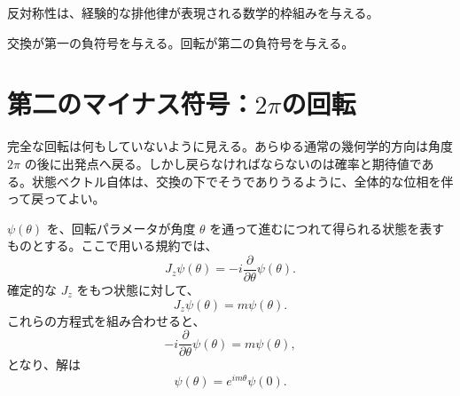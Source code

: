 反対称性は、経験的な排他律が表現される数学的枠組みを与える。

\begin{classroomqa}
\end{classroomqa}

交換が第一の負符号を与える。回転が第二の負符号を与える。

\section{第二のマイナス符号：\texorpdfstring{\(2\pi\)}{2 パイ}の回転}

完全な回転は何もしていないように見える。あらゆる通常の幾何学的方向は角度 \(2\pi\) の後に出発点へ戻る。しかし戻らなければならないのは確率と期待値である。状態ベクトル自体は、交換の下でそうでありうるように、全体的な位相を伴って戻ってよい。

\begin{classroomqa}
\end{classroomqa}


\(\psi(\theta)\) を、回転パラメータが角度 \(\theta\) を通って進むにつれて得られる状態を表すものとする。ここで用いる規約では、
\begin{equation}
J_z\psi(\theta)
=
-i\frac{\partial}{\partial\theta}\psi(\theta).
\end{equation}
確定的な \(J_z\) をもつ状態に対して、
\begin{equation}
J_z\psi(\theta)=m\psi(\theta).
\end{equation}
これらの方程式を組み合わせると、
\begin{equation}
-i\frac{\partial}{\partial\theta}\psi(\theta)
=
m\psi(\theta),
\end{equation}
となり、解は
\begin{equation}
\psi(\theta)=e^{im\theta}\psi(0).
\end{equation}

